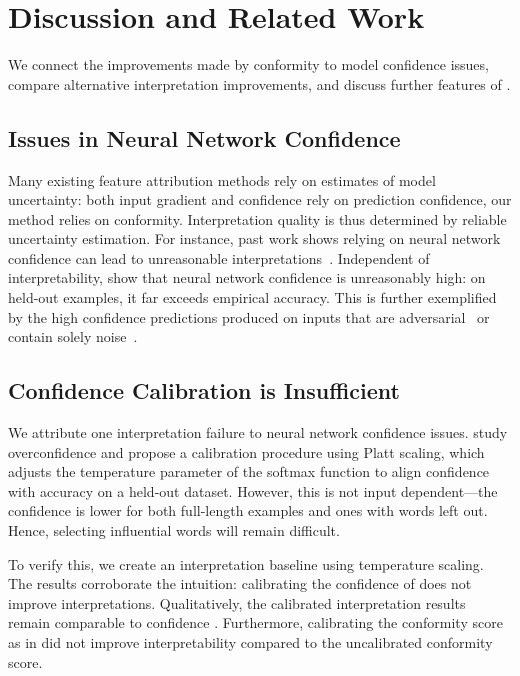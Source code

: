 \section{Discussion and Related Work}
\label{sec:discussion}

We connect the improvements made by conformity \loo{} to 
model confidence issues, compare alternative interpretation improvements,
and discuss further features of \dknn{}.

\subsection{Issues in Neural Network Confidence}
\label{sec:overconfidence}

Many existing feature attribution methods rely on estimates
of model uncertainty: both input gradient and confidence \loo{} rely on
prediction confidence, our method relies on \dknn{} conformity.
Interpretation quality is thus determined by reliable uncertainty estimation. 
For instance, past work shows relying on neural network confidence
can lead to unreasonable interpretations~\cite{kindermans2017unreliability,
ghorbani2017interpretation, feng2018rawr}. Independent of interpretability,
\citet{guo2017calibration} show that neural network confidence is unreasonably
high: on held-out examples, it far exceeds empirical accuracy.
This is further exemplified by the high confidence predictions produced on
inputs that are adversarial~\cite{szegedy2013intriguing} or contain solely
noise~\cite{goodfellow2014explaining}.

\subsection{Confidence Calibration is Insufficient}

We attribute one interpretation failure to neural network
confidence issues. \citet{guo2017calibration} study
overconfidence and propose a calibration procedure using
Platt scaling, which adjusts the temperature parameter of the softmax
function to align confidence with accuracy on a held-out dataset.
However, this is not input dependent---the confidence is lower
for both full-length examples and ones with words left out. 
Hence, selecting influential words will remain difficult.

To verify this, we create an interpretation baseline using temperature 
scaling.
The results corroborate the intuition: calibrating the confidence 
of \loo{} does not improve interpretations. Qualitatively, the 
calibrated interpretation results remain comparable to  
confidence \loo{}. Furthermore, calibrating the \dknn{}
 conformity score as in \citet{papernot2018dknn} did not improve
interpretability compared to the uncalibrated conformity score.

